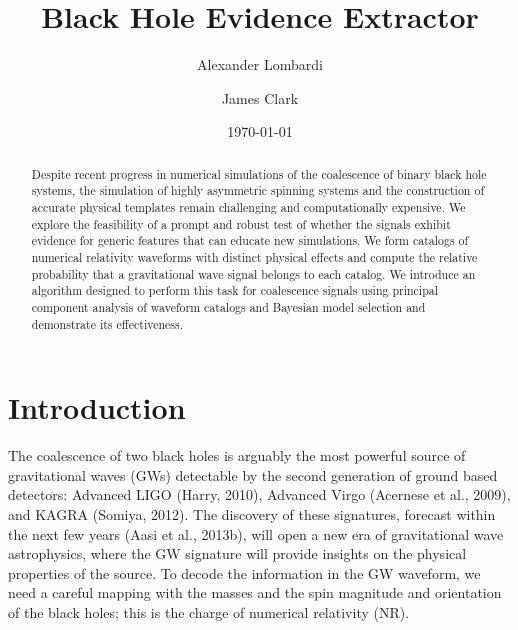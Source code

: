 \documentclass[%
 reprint,
 amsmath,amssymb,
 aps,
]{revtex4-1}
\begin{document}

\title{Black Hole Evidence Extractor}%

\author{Alexander Lombardi}
\author{James Clark}


\date{\today}%

\begin{abstract}
Despite recent progress in numerical simulations of the coalescence of binary black hole systems, the simulation of highly asymmetric spinning systems and the construction of accurate physical templates remain challenging and computationally expensive. We explore the feasibility of a prompt and robust test of whether the signals exhibit evidence for generic features that can educate new simulations. We form catalogs of numerical relativity waveforms with distinct physical effects and compute the relative probability that a gravitational wave signal belongs to each catalog. We introduce an algorithm designed to perform this task for coalescence signals using principal component analysis of waveform catalogs and Bayesian model selection and demonstrate its effectiveness.
\end{abstract}

\maketitle


\section{Introduction}
The coalescence of two black holes is arguably the most powerful source of gravitational waves (GWs) detectable by the second generation of ground based detectors: Advanced LIGO (Harry, 2010), Advanced Virgo (Acernese et al., 2009), and KAGRA (Somiya, 2012). The discovery of these signatures, forecast within the next few years (Aasi et al., 2013b), will open a new era of gravitational wave astrophysics, where the GW signature will provide insights on the physical properties of the source. To decode the information in the GW waveform, we need a careful mapping with the masses and the spin magnitude and orientation of the black holes; this is the charge of numerical relativity (NR).
\end{document}
